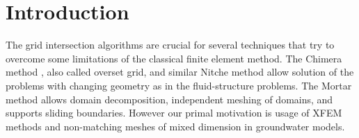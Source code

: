 

\section{Introduction}
The grid intersection algorithms are crucial for several techniques that try to overcome some limitations of the classical finite element method.
The Chimera method \cite{brezzi_analysis_2001}, also called overset grid, and similar Nitche method \cite{massing_efficient_2013}
allow solution of the problems with changing geometry as in the fluid-structure problems. 
The Mortar method \cite{belgacem_mortar_1999} allows domain decomposition, independent meshing of domains, and supports sliding boundaries.
However our primal motivation is usage of XFEM methods \cite{fries_xfem_overview_2010} and non-matching meshes of mixed dimension in groundwater models.

